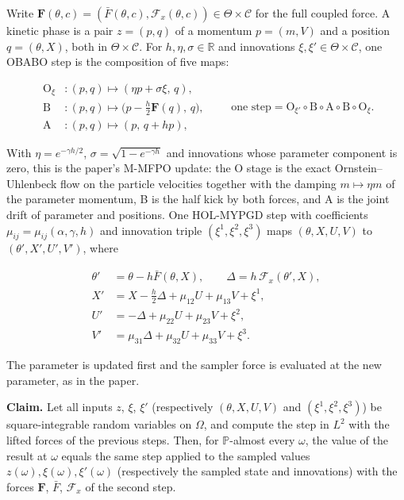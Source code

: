 \documentclass[11pt,a4paper]{report}
\begin{document}
Write \(\mathbf F(\theta,c)=(\bar F(\theta,c),\mathcal F_x(\theta,c))\in\Theta\times\mathcal C\) for the full coupled force. A kinetic phase is a pair \(z=(p,q)\) of a momentum \(p=(m,V)\) and a position \(q=(\theta,X)\), both in \(\Theta\times\mathcal C\). For \(h,\eta,\sigma\in\mathbb R\) and innovations \(\xi,\xi'\in\Theta\times\mathcal C\), one OBABO step is the composition of five maps:


\[\begin{aligned}\mathrm O_\xi&:(p,q)\mapsto(\eta p+\sigma\xi,\,q),\\ \mathrm B&:(p,q)\mapsto\bigl(p-\tfrac h2\mathbf F(q),\,q\bigr),\\ \mathrm A&:(p,q)\mapsto(p,\,q+hp),\end{aligned}\qquad\text{one step}=\mathrm O_{\xi'}\circ\mathrm B\circ\mathrm A\circ\mathrm B\circ\mathrm O_{\xi}.\]


With \(\eta=e^{-\gamma h/2}\), \(\sigma=\sqrt{1-e^{-\gamma h}}\) and innovations whose parameter component is zero, this is the paper's M-MFPO update: the O stage is the exact Ornstein–Uhlenbeck flow on the particle velocities together with the damping \(m\mapsto\eta m\) of the parameter momentum, B is the half kick by both forces, and A is the joint drift of parameter and positions. One HOL-MYPGD step with coefficients \(\mu_{ij}=\mu_{ij}(\alpha,\gamma,h)\) and innovation triple \((\xi^1,\xi^2,\xi^3)\) maps \((\theta,X,U,V)\) to \((\theta',X',U',V')\), where


\[\begin{aligned}\theta'&=\theta-h\bar F(\theta,X),\qquad \Delta=h\,\mathcal F_x(\theta',X),\\ X'&=X-\tfrac h2\Delta+\mu_{12}U+\mu_{13}V+\xi^1,\\ U'&=-\Delta+\mu_{22}U+\mu_{23}V+\xi^2,\\ V'&=\mu_{31}\Delta+\mu_{32}U+\mu_{33}V+\xi^3 .\end{aligned}\]


The parameter is updated first and the sampler force is evaluated at the new parameter, as in the paper.




\textbf{Claim.} Let all inputs \(z\), \(\xi\), \(\xi'\) (respectively \((\theta,X,U,V)\) and \((\xi^1,\xi^2,\xi^3)\)) be square-integrable random variables on \(\Omega\), and compute the step in \(L^2\) with the lifted forces of the previous steps. Then, for \(\mathbb P\)-almost every \(\omega\), the value of the result at \(\omega\) equals the same step applied to the sampled values \(z(\omega),\xi(\omega),\xi'(\omega)\) (respectively the sampled state and innovations) with the forces \(\mathbf F\), \(\bar F\), \(\mathcal F_x\) of the second step.
\end{document}
